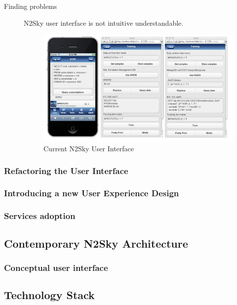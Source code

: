\begin{description}

\item[Finding problems]  N2Sky user interface is not intuitive understandable. 
\begin{figure}[htbp]
\begin{center}
  \includegraphics[width=\linewidth]{components/2/old_arch.png}
  \caption{Current N2Sky User Interface}
  \label{fig:old_arch}
\end{center}
\end{figure}

\end{description}


\subsubsection{Refactoring the User Interface}\label{Refactoring the User Interface}
\subsubsection{Introducing a new User Experience Design}\label{Introducing a new User Experience Design}
\subsubsection{Services adoption}\label{Services adoption}


\subsection{Contemporary N2Sky Architecture}\label{ContemporaryN2SkyArchitecture}
\subsubsection{Conceptual user interface}\label{Conceptual user interface}	

\subsection{Technology Stack}\label{Technology Stack}
